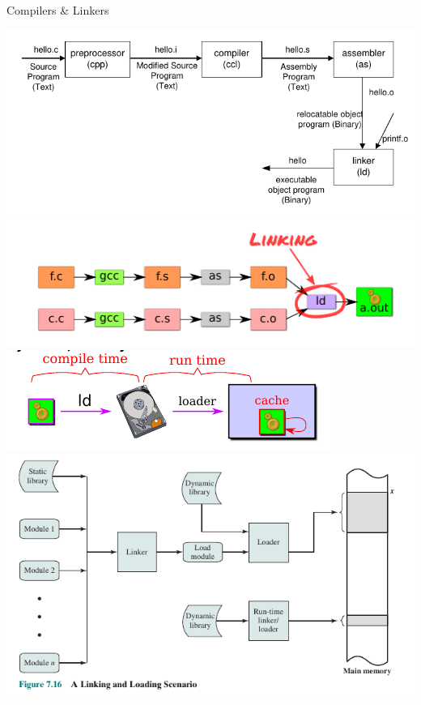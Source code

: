 \documentclass[10pt]{beamer}
\begin{document}
\begin{frame}[allowframebreaks]{Compilers \& Linkers}
\begin{center}
      \includegraphics[keepaspectratio, width=\textwidth, height=\textheight-2\baselineskip-2\baselineskip]{img/211_compiler.png} \\ \framebreak
    \includegraphics[keepaspectratio, width=\textwidth, height=\textheight-2\baselineskip-2\baselineskip]{img/220_linking_bigp.png} \\ \framebreak
    \includegraphics[keepaspectratio, width=\textwidth, height=\textheight-2\baselineskip-2\baselineskip]{img/212_compile_run.png} \\ \framebreak
    \includegraphics[keepaspectratio, width=\textwidth, height=\textheight-2\baselineskip-2\baselineskip]{img/221_linker_loader.png} \\ \framebreak
 \end{center}

\end{frame}
\end{document}
